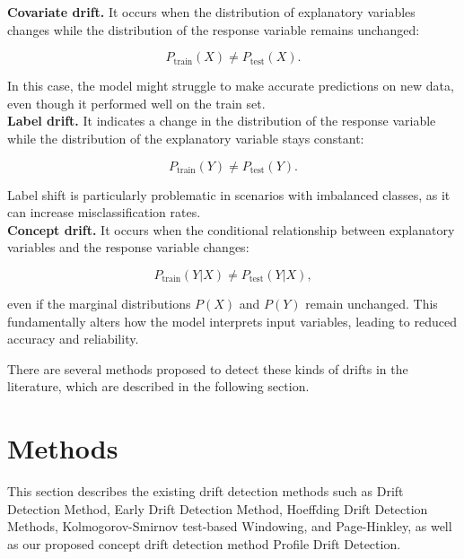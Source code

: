 \documentclass[pdflatex,sn-mathphys-ay]{sn-jnl}%
\theoremstyle{thmstyleone}%
\theoremstyle{thmstyletwo}%
\theoremstyle{thmstylethree}%
\begin{document}
\noindent \textbf{Covariate drift.} It occurs when the distribution of explanatory variables changes while the distribution of the response variable remains unchanged: 

\begin{equation}
P_{\text{train}}(X) \neq P_{\text{test}}(X).   
\end{equation}

\noindent In this case, the model might struggle to make accurate predictions on new data, even though it performed well on the train set.\\

\noindent \textbf{Label drift.} It indicates a change in the distribution of the response variable while the distribution of the explanatory variable stays constant: 

\begin{equation}
P_{\text{train}}(Y) \neq P_{\text{test}}(Y). 
\end{equation}

\noindent Label shift is particularly problematic in scenarios with imbalanced classes, as it can increase misclassification rates.\\

\noindent \textbf{Concept drift.} It occurs when the conditional relationship between explanatory variables and the response variable changes:

\begin{equation}
P_{\text{train}}(Y|X) \neq P_{\text{test}}(Y|X),
\end{equation}

\noindent even if the marginal distributions $P(X)$ and $P(Y)$ remain unchanged. This fundamentally alters how the model interprets input variables, leading to reduced accuracy and reliability.

\noindent There are several methods proposed to detect these kinds of drifts in the literature, which are described in the following section.

\section{Methods}

This section describes the existing drift detection methods such as Drift Detection Method, Early Drift Detection Method, Hoeffding Drift Detection Methods, Kolmogorov-Smirnov test-based Windowing, and Page-Hinkley, as well as our proposed concept drift detection method Profile Drift Detection.
\end{document}
